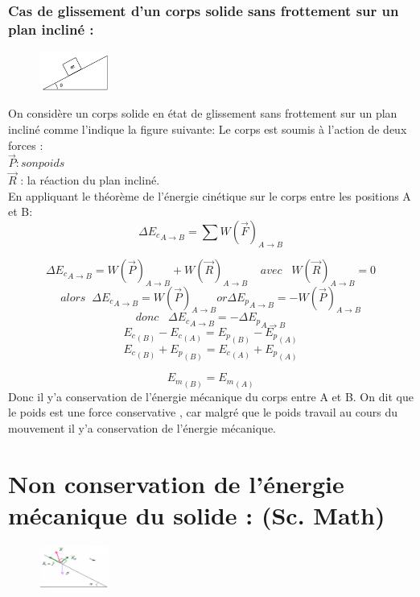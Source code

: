 \documentclass[12pt]{article}
\begin{document}
\subsubsection{Cas de glissement d'un corps solide sans frottement sur un plan incliné : }


\begin{figure}
\includegraphics[width=0.2\textwidth]{./img/img02.png}
\end{figure}

On considère un corps solide en état de glissement sans frottement sur un plan incliné comme l'indique la figure suivante: 
Le corps est soumis à l'action de deux forces :
\\$\vec{P} : son poids$
\\$\vec{R}$ : la réaction du plan incliné.
\\En appliquant le théorème de l'énergie cinétique sur le corps entre les positions A et B:
$$\Delta {E_c}_{A \rightarrow B} =\sum {W(\vec{F})}_{A \rightarrow B}$$

$$\Delta {E_c}_{A \rightarrow B} = {W(\vec{P})}_{A \rightarrow B} + {W(\vec{R})}_{A \rightarrow B} \; \;\;\; avec \; \; \; {W(\vec{R})}_{A \rightarrow B} = 0$$
$$alors \;\;  \Delta {E_c}_{A \rightarrow B} = {W(\vec{P})}_{A \rightarrow B} or \Delta {E_{p}}_{A \rightarrow B} = -{W(\vec{P})}_{A \rightarrow B} $$
$$donc \;\;\; \Delta {E_{c}}_{A \rightarrow B} = - \Delta {E_p}_{A \rightarrow B} $$
$${E_c}_{(B)} - {E_c}_{(A)} = {E_p}_{(B)} - {E_p}_{(A)}$$
$${E_c}_{(B)} + {E_p}_{(B)} = {E_c}_{(A)} + {E_p}_{(A)}$$

$${E_m}_{(B)} = {E_m}_{(A)} $$
Donc il y'a conservation de l'énergie mécanique du corps entre A et B.
On dit que le poids est une force conservative , car malgré que le poids travail au cours du mouvement il y'a conservation de l'énergie mécanique.

\section{Non conservation de l'énergie mécanique du solide : (Sc. Math) }

\begin{figure}
\includegraphics[width=0.2\textwidth]{./img/img03.png}
\end{figure}
\end{document}
